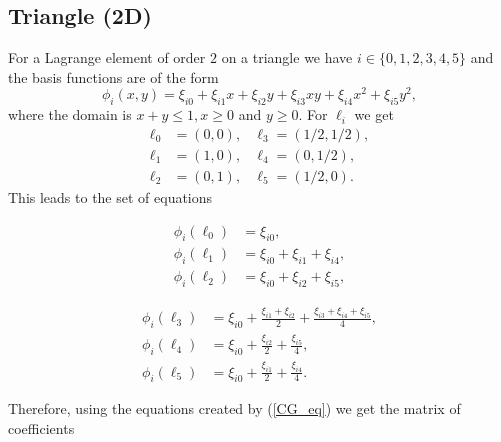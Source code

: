 \documentclass[12pt]{ociamthesis}
\begin{document}
\subsection{Triangle (2D)}
For a Lagrange element of order $2$ on a triangle we have $i \in \{0, 1, 2,3,4,5\}$ and the basis functions are of the form
\begin{equation}
\phi_i(x,y) = \xi_{i0} + \xi_{i1} x + \xi_{i2} y + \xi_{i3} xy + \xi_{i4} x^2 + \xi_{i5}y^2,
\end{equation}
where the domain is $x+y\leq 1, x \geq 0$ and $y\geq 0$. For $\ell_i$ we get
\begin{align}
\ell_0 &= (0,0), &\ell_3 = (1/2,1/2), \\
\ell_1 &= (1,0), &\ell_4 = (0,1/2), \\
\ell_2 &= (0,1), &\ell_5 = (1/2,0).
\end{align}
This leads to the set of equations
\begin{figure}[H]
 \begin{subfigure}{0.4\textwidth}
 \begin{align}
\phi_i(\ell_0) &= \xi_{i0}, \\
\phi_i(\ell_1) &= \xi_{i0} + \xi_{i1} + \xi_{i4}, \\
\phi_i(\ell_2) &= \xi_{i0} + \xi_{i2} + \xi_{i5},
 \end{align}
 \end{subfigure}
 \hfill
 \begin{subfigure}{0.6\textwidth}
 \begin{align}
 \phi_i(\ell_3) &= \xi_{i0} + \frac{\xi_{i1}+\xi_{i2}}{2} + \frac{\xi_{i3} + \xi_{i4} + \xi_{i5}}{4}, \\
 \phi_i(\ell_4) &= \xi_{i0} + \frac{\xi_{i2}}{2} + \frac{\xi_{i5}}{4},\\
 \phi_i(\ell_5) &= \xi_{i0} + \frac{\xi_{i1}}{2} + \frac{\xi_{i4}}{4}.
 \end{align}
 \end{subfigure}
 \hfill
\end{figure}
Therefore, using the equations created by (\ref{CG_eq}) we get the matrix of coefficients
\end{document}
